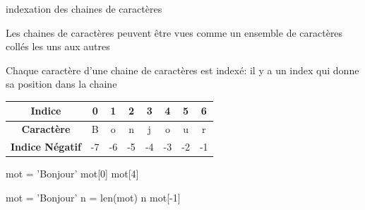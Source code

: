 \begin{easybox}{indexation des chaines de caractères}{}
    
    \begin{minipage}{0.5\linewidth}
 Les chaines de caractères peuvent être vues comme un ensemble de caractères \og{}collés\fg{} les uns aux autres

    Chaque caractère d'une chaine de caractères est indexé: 
    il y a un index qui donne sa position dans la chaine       
    \end{minipage}\hfill{}
    \begin{minipage}{0.5\linewidth}
 \begin{center}
        \begin{tabular}{|c|c|c|c|c|c|c|c|}
        \hline
        \textbf{Indice} & 0 & 1 & 2 & 3 & 4 & 5 & 6 \\
        \hline
        \textbf{Caractère} & B & o & n & j & o & u & r \\
        \hline
        \textbf{Indice Négatif} & -7 & -6 & -5 & -4 & -3 & -2 & -1 \\
        \hline
        \end{tabular}
    \end{center}       
    \end{minipage}
    
   
    

    \begin{minipage}[t]{0.48\linewidth}
        \begin{ConsolePythontex}[Label=false]{}
            mot = 'Bonjour'
            mot[0]
            mot[4]
        \end{ConsolePythontex}
    \end{minipage}\hfill
    \begin{minipage}[t]{0.48\linewidth}
        \begin{ConsolePythontex}[Label=false]{}
mot = 'Bonjour'
n = len(mot)
n
mot[-1]
		\end{ConsolePythontex}
    \end{minipage}
   
\end{easybox}

